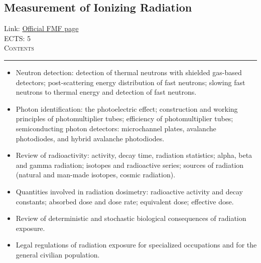 \documentclass[11pt, a4paper]{article}
\newenvironment{course}[3]{
\subsection{#1}%
Link: \href{#2}{Official FMF page}\\%
ECTS: #3%
\vspace{1ex}
\\
{\large \textsc{Contents}}\\[-0.9ex]%
\rule{\textwidth}{0.5pt}
\vspace{-3ex}
}
{}
\newenvironment{chapter}[1]{
\begin{tcolorbox}[title=#1, breakable]
}
{\end{tcolorbox}}
\begin{document}
\begin{course}{Measurement of Ionizing Radiation}{https://www.fmf.uni-lj.si/en/study-physics/programmes/1fiz/2020/7000777/courses/1446/}{5}
\begin{chapter}{Particle identification}
\begin{itemize}
            \item Neutron detection: detection of thermal neutrons with shielded gas-based detectors; post-scattering energy distribution of fast neutrons; slowing fast neutrons to thermal energy and detection of fast neutrons.

            \item Photon identification: the photoelectric effect; construction and working principles of photomultiplier tubes; efficiency of photomultiplier tubes; semiconducting photon detectors: microchannel plates, avalanche photodiodes, and hybrid avalanche photodiodes.
        
        \end{itemize}
    \end{chapter}

    \begin{chapter}{Radiation safety}
        \begin{itemize}
        
            \item Review of radioactivity: activity, decay time, radiation statistics; alpha, beta and gamma radiation; isotopes and radioactive series; sources of radiation (natural and man-made isotopes, cosmic radiation).

            \item Quantities involved in radiation dosimetry: radioactive activity and decay constants; absorbed dose and dose rate; equivalent dose; effective dose.

            \item Review of deterministic and stochastic biological consequences of radiation exposure.

            \item Legal regulations of radiation exposure for specialized occupations and for the general civilian population.

        \end{itemize}
    \end{chapter}
\end{course}
\end{document}
